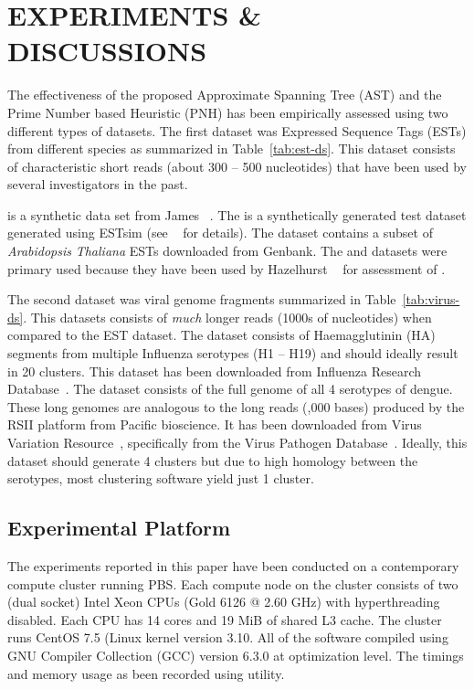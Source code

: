 \section{EXPERIMENTS \& DISCUSSIONS}\label{sec:results}

The effectiveness of the proposed Approximate Spanning Tree (AST) and
the Prime Number based Heuristic (PNH) has been empirically assessed
using two different types of datasets.  The first dataset was
Expressed Sequence Tags (ESTs) from different species as summarized in
Table~\ref{tab:est-ds}.  This dataset consists of characteristic
short reads (about 300 -- 500 nucleotides) that have been used by
several investigators in the past.  



 is a synthetic data set from James \etal~\cite{james-18}.  The
 is a synthetically generated test dataset generated using
ESTsim (see ~\cite{hazelhurst-11} for details).  The 
dataset contains a subset of \emph{Arabidopsis} \emph{Thaliana} ESTs
downloaded from Genbank.  The  and  datasets were
primary used because they have been used by Hazelhurst
\etal~\cite{hazelhurst-11} for assessment of .


The second dataset was viral genome fragments summarized in
Table~\ref{tab:virus-ds}.  This datasets consists of \emph{much}
longer reads (1000s of nucleotides) when compared to the EST dataset.
The  dataset consists of Haemagglutinin (HA) segments from
multiple Influenza serotypes (H1 -- H19) and should ideally result in
20 clusters.  This dataset has been downloaded from Influenza Research
Database~\cite{bogner-06}.  The  dataset consists of the
full genome of all 4 serotypes of dengue.  These long genomes are
analogous to the long reads (,000 bases) produced by the
RSII platform from Pacific bioscience.  It has been downloaded from
Virus Variation Resource~\cite{brister-14}, specifically from the
Virus Pathogen Database~\cite{pickett-12}.  Ideally, this dataset
should generate 4 clusters but due to high homology between the
serotypes, most clustering software yield just 1 cluster.



\subsection{Experimental Platform}

The experiments reported in this paper have been conducted on a
contemporary compute cluster running PBS.  Each compute node on the
cluster consists of two (dual socket) Intel
Xeon\textsuperscript{\textregistered}\/ CPUs (Gold 6126 @ 2.60 GHz)
with hyperthreading disabled.  Each CPU has 14 cores and 19 MiB of
shared L3 cache.  The cluster runs CentOS 7.5 (Linux kernel version
3.10.  All of the software compiled using GNU Compiler Collection
(GCC) version 6.3.0 at  optimization level.  The timings and
memory usage as been recorded using  utility.

